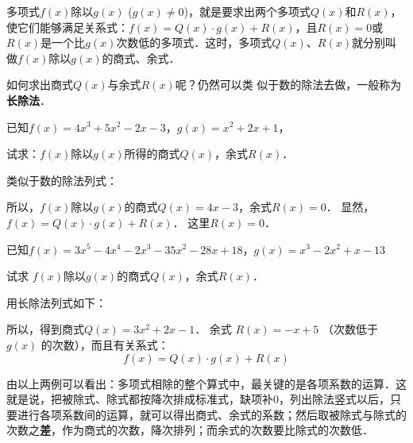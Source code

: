 多项式$f(x)$除以$g(x)$ ($g(x)\ne 0$)，就是要求出两个多项式$Q(x)$和$R(x)$，使它们能够满足关系式：$f(x)=Q(x)\cdot g(x)+R(x)$，且$R(x)=0$或$R(x)$是一个比$g(x)$次数低的多项式．这时，多项式$Q(x)$、$R(x)$就分别叫做$f(x)$除以$g(x)$的商式、余式．

如何求出商式$Q(x)$与余式$R(x)$呢？仍然可以类
似于数的除法去做，一般称为\textbf{长除法}．

\begin{example}
    已知$f(x)=4x^3+5x^2-2x-3$，$g (x) =x^2+2x+1$，
   
    试求：$f(x)$除以$g(x)$所得的商式$Q(x)$，余式$R(x)$．
\end{example}

\begin{solution}
    类似于数的除法列式：
    

    所以，$f(x)$除以$g(x)$的商式$Q(x)=4x-3$，余式$R (x) =0$．
    显然，$f(x)=Q(x)\cdot g(x)+R(x)$．
    这里$R(x)=0$．
\end{solution}

\begin{example}
已知$f(x)=3x^5-4x^4-2x^3-35x^2-28x+18$，$g (x) =x^3-2x^2+x-13$

试求 $f(x)$除以$g(x)$的商式$Q(x)$，余式$R(x)$．
\end{example}

\begin{solution}
    用长除法列式如下：


    所以，得到商式$Q(x)=3x^2+2x-1$．
    余式 $R(x)=-x+5$ （次数低于$g(x)$
    的次数），而且有关系式：
   \[ f (x) =Q (x) \cdot g (x) +R (x) \]

\end{solution}


    由以上两例可以看出：多项式相除的整个算式中，最关键的是各项系数的运算．这就是说，把被除式、除式都按降次排成标准式，缺项补0，列出除法竖式以后，只要进行各项系数间的运算，就可以得出商式、余式的系数；然后取被除式与除式的次数之\textbf{差}，作为商式的次数，降次排列；而余式的次数要比除式的次数低．
    

